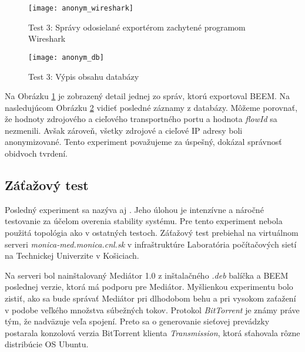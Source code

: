 \begin{figure}[ht!]
\centering
\texttt{[image: anonym\_wireshark]}
\caption{Test 3: Správy odosielané exportérom zachytené programom Wireshark}\label{o:anonym_wireshark}
\end{figure}

\begin{figure}[ht!]
\centering
\texttt{[image: anonym\_db]}
\caption{Test 3: Výpis obsahu databázy}\label{o:anonym_db}
\end{figure}


Na Obrázku \ref{o:anonym_wireshark} je zobrazený detail jednej zo správ, ktorú exportoval BEEM. 
Na nasledujúcom Obrázku \ref{o:anonym_db} vidieť posledné záznamy z databázy. Môžeme porovnať, že hodnoty 
zdrojového a cieľového transportného portu a hodnota \emph{flowId} sa nezmenili. Avšak zároveň, všetky 
zdrojové a cieľové IP adresy boli anonymizované. Tento experiment považujeme za úspešný, dokázal správnosť 
obidvoch tvrdení.


\subsection{Záťažový test}

Posledný experiment sa nazýva aj . Jeho úlohou je intenzívne a náročné testovanie 
za účelom overenia stability systému. Pre tento experiment nebola použitá topológia ako v ostatných testoch.
Záťažový test prebiehal na virtuálnom serveri \emph{monica-med.monica.cnl.sk} v infraštruktúre Laboratória
počítačových sietí na Technickej Univerzite v Košiciach.

Na serveri bol nainštalovaný Mediátor 1.0 z inštalačného \emph{.deb} balíčka a BEEM poslednej verzie, ktorá 
má podporu pre Mediátor. Myšlienkou experimentu bolo zistiť, ako sa bude správať Mediátor pri dlhodobom 
behu a pri vysokom zaťažení v podobe veľkého množstva súbežných tokov. Protokol \emph{BitTorrent}
\citep{bittorrent} je známy práve tým, že nadväzuje veľa spojení. Preto sa o generovanie sieťovej 
prevádzky postarala konzolová verzia BitTorrent klienta \emph{Transmission}, ktorá sťahovala rôzne 
distribúcie OS Ubuntu.

